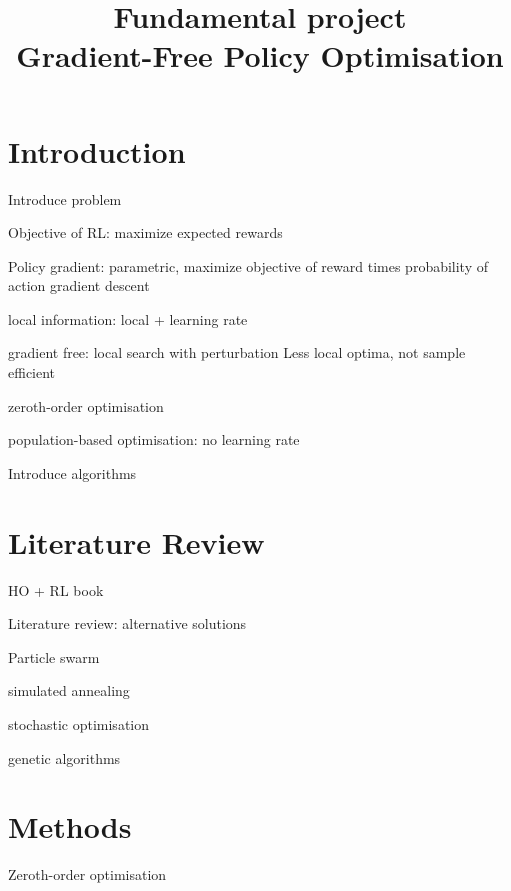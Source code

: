 \documentclass[10pt]{article}
\title{Fundamental project\\\LARGE Gradient-Free Policy Optimisation}
\begin{document}
\maketitle

\section{Introduction}
Introduce problem

Objective of RL: maximize expected rewards

Policy gradient: parametric, maximize objective of reward times probability of action
gradient descent

local information: local + learning rate

gradient free: local search with perturbation
Less local optima, not sample efficient

zeroth-order optimisation

population-based optimisation: no learning rate


Introduce algorithms
\section{Literature Review}

HO + RL book

Literature review: alternative solutions

Particle swarm

simulated annealing

stochastic optimisation

genetic algorithms

\section{Methods}

\begin{algorithm}

    \caption{Zeroth-order optimisation}
    \label{alg:zeroth}
\end{algorithm}
\end{document}
